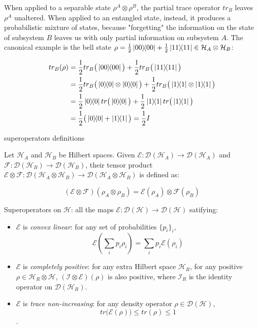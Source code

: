 \documentclass[10pt,a4paper, titlepage]{report}
\theoremstyle{definition}
\newcommand{\note}[1]{{\color{red} #1}}
\newcommand{\ketbra}[2]{\ket{#1}\!\!\bra{#2}}
\newcommand{\proj}[1]{\ketbra{#1}{#1}}
\newcommand{\calH}{\mathcal{H}}
\newcommand{\calDH}{\mathcal{D}(\mathcal{H})}
\newcommand{\sop}{\mathcal{E}}
\newcommand{\tensor}{\otimes}
\begin{document}
When applied to a separable state $\rho^A \tensor \rho^B$, the partial trace operator $tr_B$ leaves $\rho^A$ unaltered. When applied to an entangled state, instead, it produces a probabilistic mixture of states, because "forgetting" the information on the state of subsystem $B$ leaves us with only partial information on subsystem $A$. The canonical example is the bell state $\rho = \frac{1}{2} \proj{00} + \frac{1}{2}\proj{11} \in \calH_A \tensor \calH_B$:

\begin{align*}
tr_B(\rho) &= \frac{1}{2} tr_B\big(\proj{00}\big) + \frac{1}{2}tr_B\big(\proj{11}\big)  \\
	&= \frac{1}{2} tr_B\big(\proj{0}\tensor\proj{0}\big) + \frac{1}{2}tr_B\big(\proj{1}\tensor\proj{1}\big) \\
	&= \frac{1}{2} \proj{0}tr\big(\proj{0}\big) + \frac{1}{2}\proj{1}tr\big(\proj{1}\big) \\
	&= \frac{1}{2} \big(\proj{0} + \proj{1}\big) = \frac{1}{2}I
\end{align*}

\note{superoperators definitions}


Let $\calH_A$ and $\calH_B$ be Hilbert spaces. Given $\mathcal{E}: \mathcal{D}(\calH_A) \rightarrow \mathcal{D}(\calH_A)$ and $\mathcal{F}: \mathcal{D}(\calH_B) \rightarrow \mathcal{D}(\calH_B)$,  their tensor product $\sop\tensor \mathcal{F}: \mathcal{D}(\calH_A \tensor \calH_B)\rightarrow \mathcal{D}(\calH_A \tensor \calH_B)$ is defined as:

\[
	(\sop \tensor \mathcal{F})(\rho_A \tensor \rho_B) = \sop(\rho_A)\tensor \mathcal{F}(\rho_B)
\]


Superoperators on $\calH$: all the maps $\sop: \calDH \rightarrow \calDH$ satifying:
\begin{itemize}
\item $\sop$ is \textit{convex linear}: for any set of probabilities	$\{p_i\}_i$,
\[\sop\left(\sum_i p_i \rho_i \right) = \sum_i p_i \sop(\rho_i)\]
\item $\sop$ is \textit{completely positive}: for any extra Hilbert space $\calH_R$, for any positive $\rho \in \calH_R \tensor \calH$, $(\mathcal{I}\tensor \sop)(\rho)$ is also positive, where $\mathcal{I}_R$ is the identity operator on $\mathcal{D}(\calH_R)$.
\item $\sop$ is \textit{trace non-increasing}: for any density operator $\rho \in \calDH$, 
\[tr\big(\sop(\rho)\big) \leq tr(\rho) \leq 1\].
\end{itemize}
\end{document}
